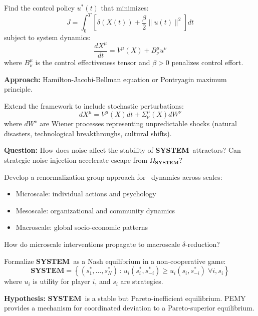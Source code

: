 \documentclass[11pt,a4paper]{article}
\newcommand{\SYSTEM}{\textbf{SYSTEM}}
\theoremstyle{definition}
\theoremstyle{remark}
\begin{document}
\begin{problem}
Find the control policy $u^*(t)$ that minimizes:
\[
J = \int_0^T \left[ \delta(X(t)) + \frac{\beta}{2} \|u(t)\|^2 \right] dt
\]
subject to system dynamics:
\[
\frac{dX^\mu}{dt} = V^\mu(X) + B^\mu_\nu u^\nu
\]
where $B^\mu_\nu$ is the control effectiveness tensor and $\beta > 0$ penalizes control effort.

\textbf{Approach:} Hamilton-Jacobi-Bellman equation or Pontryagin maximum principle.
\end{problem}

\begin{problem}
Extend the framework to include stochastic perturbations:
\[
dX^\mu = V^\mu(X) dt + \Sigma^\mu_\nu(X) dW^\nu
\]
where $dW^\nu$ are Wiener processes representing unpredictable shocks (natural disasters, technological breakthroughs, cultural shifts).

\textbf{Question:} How does noise affect the stability of \SYSTEM\ attractors? Can strategic noise injection accelerate escape from $\Omega_{\SYSTEM}$?
\end{problem}

\begin{problem}
Develop a renormalization group approach for \SESES\ dynamics across scales:
\begin{itemize}[leftmargin=1.5em]
    \item Microscale: individual actions and psychology
    \item Mesoscale: organizational and community dynamics
    \item Macroscale: global socio-economic patterns
\end{itemize}
How do microscale interventions propagate to macroscale $\delta$-reduction?
\end{problem}

\begin{problem}
Formalize \SYSTEM\ as a Nash equilibrium in a non-cooperative game:
\[
\SYSTEM = \left\{ (s_1^*, \ldots, s_N^*) \,:\, u_i(s_i^*, s_{-i}^*) \geq u_i(s_i, s_{-i}^*) \;\forall i, s_i \right\}
\]
where $u_i$ is utility for player $i$, and $s_i$ are strategies.

\textbf{Hypothesis:} \SYSTEM\ is a stable but Pareto-inefficient equilibrium. PEMY provides a mechanism for coordinated deviation to a Pareto-superior equilibrium.
\end{problem}
\end{document}
